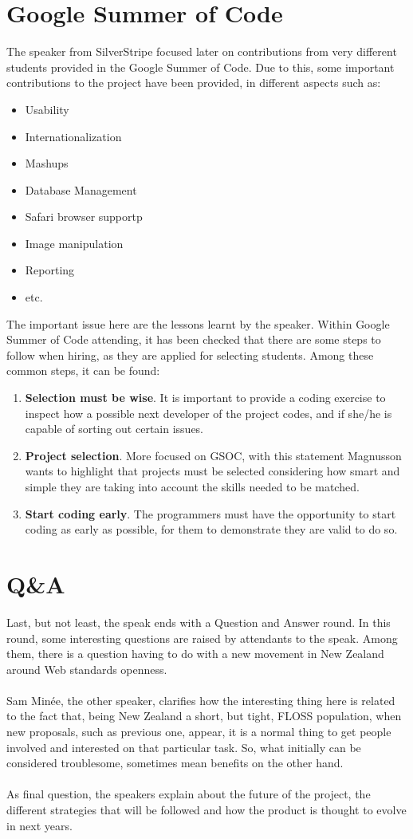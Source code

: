 \documentclass[11pt]{article}
\begin{document}
\section{Google Summer of Code}
The speaker from SilverStripe focused later on contributions from very different students provided in the Google Summer of Code. Due to this, some important contributions to the project have been provided, in different aspects such as:
\begin{itemize}\itemsep0pt
\item{Usability}
\item{Internationalization}
\item{Mashups}
\item{Database Management}
\item{Safari browser support}p
\item{Image manipulation}
\item{Reporting}
\item{etc.}
\end{itemize}
The important issue here are the lessons learnt by the speaker. Within Google Summer of Code attending, it has been checked that there are some steps to follow when hiring, as they are applied for selecting students. Among these common steps, it can be found:
\begin{enumerate}\itemsep0pt
\item{\textbf{Selection must be wise}}. It is important to provide a coding exercise to inspect how a possible next developer of the project codes, and if she/he is capable of sorting out certain issues.
\item{\textbf{Project selection}}. More focused on GSOC, with this statement Magnusson wants to highlight that projects must be selected considering how smart and simple they are taking into account the skills needed to be matched.
\item{\textbf{Start coding early}}. The programmers must have the opportunity to start coding as early as possible, for them to demonstrate they are valid to do so.
\end{enumerate}

\section{Q\&A}
  Last, but not least, the speak ends with a Question and Answer round. In this round, some interesting questions are raised by attendants to the speak. Among them, there is a question having to do with a new movement in New Zealand around Web standards openness.\\
\\
  Sam Minée, the other speaker, clarifies how the interesting thing here is related to the fact that, being New Zealand a short, but tight, FLOSS population, when new proposals, such as previous one, appear, it is a normal thing to get people involved and interested on that particular task. So, what initially can be considered troublesome, sometimes mean benefits on the other hand.\\
\\
As final question, the speakers explain about the future of the project, the different strategies that will be followed and how the product is thought to evolve in next years.


{}
\end{document}
